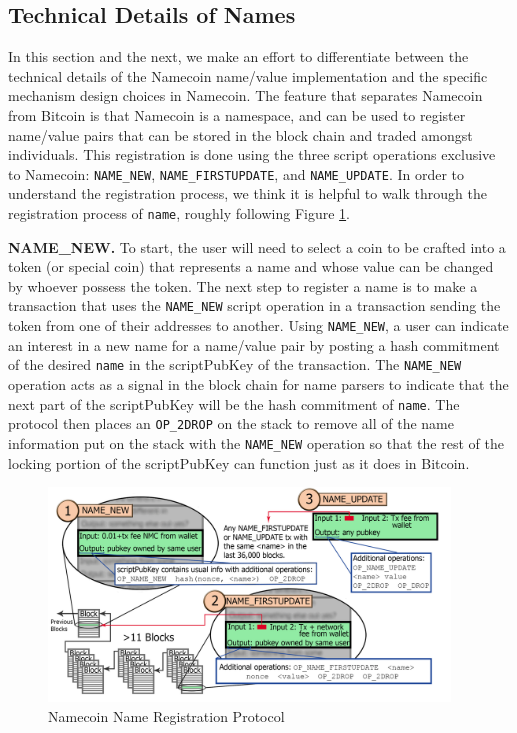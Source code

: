\subsection{Technical Details of Names}

In this section and the next, we make an effort to differentiate between the technical details of the Namecoin name/value implementation and the specific mechanism design choices in Namecoin. The feature that separates Namecoin from Bitcoin is that Namecoin is a namespace, and can be used to register name/value pairs that can be stored in the block chain and traded amongst individuals. This registration is done using the three script operations exclusive to Namecoin: {\tt NAME\_NEW}, {\tt NAME\_FIRSTUPDATE}, and {\tt NAME\_UPDATE}. In order to understand the registration process, we think it is helpful to walk through the registration process of {\tt name}, roughly following Figure \ref{fig:registration}. 

{\bf NAME\_NEW.}
To start, the user will need to select a coin to be crafted into a token (or special coin) that represents a name and whose value can be changed by whoever possess the token. The next step to register a name is to make a transaction that uses the {\tt NAME\_NEW} script operation in a transaction sending the token from one of their addresses to another. Using {\tt NAME\_NEW}, a user can indicate an interest in a new name for a name/value pair by posting a hash commitment of the desired {\tt name} in the scriptPubKey of the transaction. The {\tt NAME\_NEW} operation acts as a signal in the block chain for name parsers to indicate that the next part of the scriptPubKey will be the hash commitment of {\tt name}. The protocol then places an {\tt OP\_2DROP} on the stack to remove all of the name information put on the stack with the {\tt NAME\_NEW} operation so that the rest of the locking portion of the scriptPubKey can function just as it does in Bitcoin. 

\begin{figure}
  \centering
  \includegraphics[width=0.95\textwidth]{registration.png}
  \caption{Namecoin Name Registration Protocol}
  \label{fig:registration}
\end{figure}

